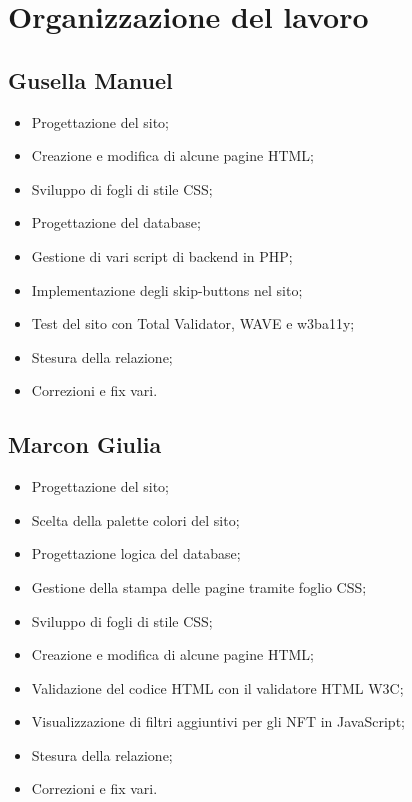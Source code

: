 \documentclass[10pt]{article}
\begin{document}
\section{Organizzazione del lavoro}
\subsection{Gusella Manuel}
\begin{itemize}
    \item Progettazione del sito;
    \item Creazione e modifica di alcune pagine HTML;
    \item Sviluppo di fogli di stile CSS;
    \item Progettazione del database;
    \item Gestione di vari script di backend in PHP;
    \item Implementazione degli skip-buttons nel sito;
    \item Test del sito con Total Validator, WAVE e w3ba11y;
    \item Stesura della relazione;
    \item Correzioni e fix vari.
\end{itemize}
\subsection{Marcon Giulia}
\begin{itemize}
    \item Progettazione del sito;
    \item Scelta della palette colori del sito;
    \item Progettazione logica del database;
    \item Gestione della stampa delle pagine tramite foglio CSS;
    \item Sviluppo di fogli di stile CSS;
    \item Creazione e modifica di alcune pagine HTML;
    \item Validazione del codice HTML con il validatore HTML W3C;
    \item Visualizzazione di filtri aggiuntivi per gli NFT in JavaScript;
    \item Stesura della relazione;
    \item Correzioni e fix vari.
\end{itemize}
\end{document}
